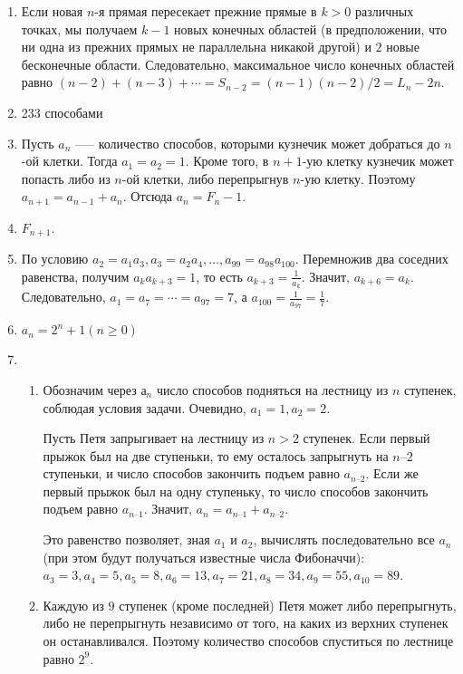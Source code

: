 \documentclass[14pt,openany]{book}
\begin{document}
\begin{enumerate}
\item Если новая $n$-я прямая пересекает прежние прямые в $k>0$ различных точках,
мы получаем $k-1$ новых конечных областей (в предположении, что ни одна из прежних прямых
не параллельна никакой другой) и $2$ новые бесконечные области. Следовательно, максимальное
число конечных областей равно $(n-2) + (n-3) + \cdots = S_{n-2} = (n-1)(n-2)/2 = L_n-2n$.

\item 233 способами

\item Пусть $a_n$ --— количество способов, которыми кузнечик может добраться до $n$-ой клетки. Тогда $a_1 = a_2 = 1$. Кроме того, в $n+1$-ую клетку кузнечик может попасть либо из $n$-ой клетки, либо перепрыгнув $n$-ую клетку. Поэтому $a_{n + 1} = a_{n - 1} + a_n$. Отсюда $a_n = F_n - 1$. 

\item $F_{n + 1}$.

\item По условию  $a_2 = a_1a_3, a_3 = a_2a_4, \ldots, a_{99} = a_{98}a_{100}$.
      Перемножив два соседних равенства, получим $a_ka_{k+3} = 1$,  то есть 
      $a_{k+3} = \frac{1}{a_k}$. Значит, $a_{k+6} = a_k$. 
      Следовательно, $a_1 = a_7 = \cdots = a_{97} = 7$,
      а $a_{100} = \frac{1}{a_{97}} = \frac{1}{7}$.

\item $a_n = 2^n + 1 (n \ge 0)$

\item \begin{enumerate}
    \item Обозначим через $а_n$ число способов подняться на лестницу из $n$ ступенек, соблюдая условия задачи. Очевидно,  $a_1 = 1,  a_2 = 2$.
    
   Пусть Петя запрыгивает на лестницу из $n > 2$  ступенек. Если первый прыжок был на две ступеньки, то ему осталось запрыгнуть на  $n – 2$  ступеньки, и число способов закончить подъем равно $a_{n–2}$. Если же первый прыжок был на одну ступеньку, то число способов закончить подъем равно $a_{n–1}$. Значит, $a_n = a_{n–1} + a_{n–2}$.

   Это равенство позволяет, зная $a_1$ и $a_2$, вычислять последовательно все $a_n$ (при этом будут получаться известные числа Фибоначчи):
$a_3 = 3,  a_4 = 5,  a_5 = 8,  a_6 = 13,  a_7 = 21,  a_8 = 34,  a_9 = 55,  a_{10} = 89$.

   \item Каждую  из $9$ ступенек (кроме последней) Петя может либо перепрыгнуть, либо не перепрыгнуть независимо от того, на каких из верхних ступенек он останавливался. Поэтому количество способов спуститься по лестнице равно $2^9$.


\end{enumerate}
\end{enumerate}
\end{document}
